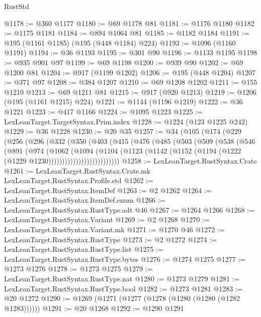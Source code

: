\begin{lexlean}{RustStd}
\begin{coremodule}
@1178 := @360 @1177
@1180 := @69 @1178 @81
@1181 := @1176 @1180
@1182 := @1175 @1181
@1184 := @894 @1064 @81
@1185 := @1182 @1184
@1191 := @195 (@1161 @1185) (@195 (@448 @1184) @224)
@1193 := @1096 (@1160 @1191)
@1194 := @36 @1193
@1195 := @301 @90
@1196 := @1133 @1195
@1198 := @935 @901 @97
@1199 := @69 @1198
@1200 := @939 @90
@1202 := @69 @1200 @81
@1204 := @917 (@1199 @1202)
@1206 := @195 (@448 @1204)
@1207 := @371 @97
@1208 := @384 @1207
@1210 := @69 @1208 @1202
@1211 := @155 @1210
@1213 := @69 @1211 @81
@1215 := @917 (@920 @1213)
@1219 := @1206 (@195 (@1161 @1215) @224)
@1221 := @1144 (@1196 @1219)
@1222 := @36 @1221
@1223 := @417 @1166
@1224 := @1095 @1223
@1225 := LexLeanTarget.TargetSyntax.Prim.index
@1228 := @1224 (@123 @1225 @242)
@1229 := @36 @1228
@1230 := @20 @35
@1257 := @34
    (@105
      (@174
        (@229
          (@256
            (@296
              (@332
                (@350
                  (@403
                    (@415
                      (@476
                        (@485
                          (@503
                            (@509
                              (@538
                                (@546
                                  (@891
                                    (@974
                                      (@1062
                                        (@1094
                                          (@1104
                                            (@1123
                                              (@1142
                                                (@1152
                                                  (@1194
                                                    (@1222 (@1229 @1230))))))))))))))))))))))))))
@1258 := LexLeanTarget.RustSyntax.Crate
@1261 := LexLeanTarget.RustSyntax.Crate.mk LexLeanTarget.RustSyntax.Profile.std
@1262 := LexLeanTarget.RustSyntax.ItemDef
@1263 := @2 @1262
@1264 := LexLeanTarget.RustSyntax.ItemDef.enum
@1266 := LexLeanTarget.RustSyntax.RustType.adt @46
@1267 := @1264 @1266
@1268 := LexLeanTarget.RustSyntax.Variant
@1269 := @2 @1268
@1270 := LexLeanTarget.RustSyntax.Variant.mk
@1271 := @1270 @46
@1272 := LexLeanTarget.RustSyntax.RustType
@1273 := @2 @1272
@1274 := LexLeanTarget.RustSyntax.RustType.list
@1275 := LexLeanTarget.RustSyntax.RustType.bytes
@1276 := @1274 @1275
@1277 := @1273 @1276
@1278 := @1273 @1275
@1279 := LexLeanTarget.RustSyntax.RustType.nat
@1280 := @1273 @1279
@1281 := LexLeanTarget.RustSyntax.RustType.bool
@1282 := @1273 @1281
@1283 := @20 @1272
@1290 := @1269 (@1271 (@1277 (@1278 (@1280 (@1280 (@1282 @1283))))))
@1291 := @20 @1268
@1292 := @1290 @1291

\end{coremodule}
\end{lexlean}
